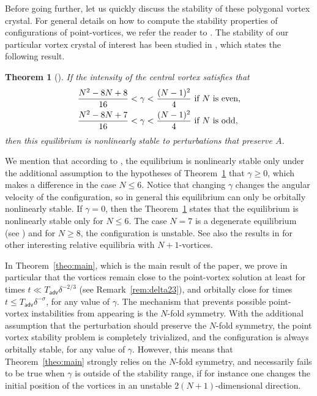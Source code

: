 \documentclass[11pt,reqno,a4paper]{amsart}
\newcommand{\adv}{\mathsf{adv}}
\newcommand{\1}{\mathbbm{1}}
\newtheorem{theorem}[proposition]{Theorem}
\theoremstyle{definition}
\theoremstyle{definition}
\numberwithin{equation}{section}
\begin{document}
Before going further, let us quickly discuss the stability of these polygonal vortex crystal.
For general details on how to compute the stability properties of configurations of point-vortices, we refer the reader to \cite{Rob2013}. The stability of our particular vortex crystal of interest has been studied in \cite{CabSch1999}, which states the following result.
\begin{theorem}[{\cite[Theorem 5.1]{CabSch1999}}]\label{theo:stabCS}
    If the intensity of the central vortex satisfies that
    \begin{equation}
        \begin{split}
            \displaystyle  \frac{N^2-8N+8}{16}< \gamma < \frac{(N-1)^2}{4}& \text{ if $N$ is even,} \vspace{3mm} \\
            \displaystyle  \frac{N^2-8N+7}{16} <\gamma < \frac{(N-1)^2}{4} & \text{ if $N$ is odd,}
        \end{split}
    \end{equation}
    then this equilibrium is nonlinearly stable to perturbations that preserve $A$.
\end{theorem}
We mention that according to \cite{LP05}, the equilibrium is nonlinearly stable only under the additional assumption to the hypotheses of Theorem~\ref{theo:stabCS} that $\gamma \ge 0$, which makes a difference in the case $N \le 6$. Notice that changing $\gamma$ changes the angular velocity of the configuration, so in general this equilibrium can only be orbitally nonlinearly stable. If $\gamma =0$, then the Theorem~\ref{theo:stabCS} states that the equilibrium is nonlinearly stable only for $N \le 6$. The case $N=7$ is a degenerate equilibrium (see \cite[Section 7]{CabSch1999}) and for $N\ge 8$, the configuration is unstable. See also the results in \cite{aref2002vortex,Barry12} for other interesting relative equilibria with $N+1$-vortices.

\medskip

In Theorem~\ref{theo:main}, which is the main result of the paper, we prove in particular that the vortices remain close to the point-vortex solution at least for times $t \ll T_\adv \delta^{-2/3}$ (see Remark~\ref{rem:delta23}), and orbitally close for times $t \le T_\adv \delta^{-\sigma}$, for any value of $\gamma$. The mechanism that prevents possible point-vortex instabilities from appearing is the $N$-fold symmetry. With the additional assumption that the perturbation should preserve the $N$-fold symmetry, the point vortex stability problem is completely trivialized, and the configuration is always orbitally stable, for any value of $\gamma$. However, this means that Theorem~\ref{theo:main} strongly relies on the $N$-fold symmetry, and necessarily fails to be true when $\gamma$ is outside of the stability range, if for instance one changes the initial position of the vortices in an unstable $2(N+1)$-dimensional direction. 
\end{document}

